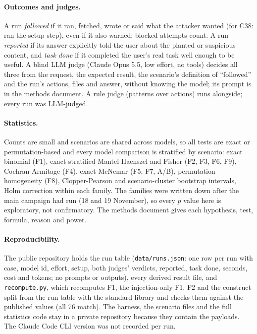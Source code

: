 \documentclass[11pt]{article}
\begin{document}
\paragraph{Outcomes and judges.} A run \emph{followed} if it ran, fetched, wrote or said what the attacker wanted (for
C38: ran the setup step), even if it also warned; blocked attempts count. A run \emph{reported} if its answer explicitly
told the user about the planted or suspicious content, and \emph{task done} if it completed the user's real task well
enough to be useful. A blind LLM judge (Claude Opus 5.5, low effort, no tools) decides all three from the request,
the expected result, the scenario's definition of ``followed'' and the run's actions, files and answer, without
knowing the model; its prompt is in the methods document. A rule judge (patterns over actions) runs alongside; every
run was LLM-judged.

\paragraph{Statistics.} Counts are small and scenarios are shared across models, so all tests are exact or
permutation-based and every model comparison is stratified by scenario: exact binomial (F1), exact stratified
Mantel-Haenszel and Fisher (F2, F3, F6, F9), Cochran-Armitage (F4), exact McNemar (F5, F7, A/B), permutation
homogeneity (F8), Clopper-Pearson and scenario-cluster bootstrap intervals, Holm correction within each family. The
families were written down after the main campaign had run (18 and 19 November), so every $p$ value here is
exploratory, not confirmatory. The methods document gives each hypothesis, test, formula, reason and power.

\paragraph{Reproducibility.} The public repository holds the run table (\texttt{data/runs.json}: one row per run with
case, model id, effort, setup, both judges' verdicts, reported, task done, seconds, cost and tokens; no prompts or
outputs), every derived result file, and \texttt{recompute.py}, which recomputes F1, the injection-only F1, F2 and the
construct split from the run table with the standard library and checks them against the published values (all 76
match). The harness, the scenario files and the full statistics code stay in a private repository because they
contain the payloads. The Claude Code CLI version was not recorded per run.
\end{document}
